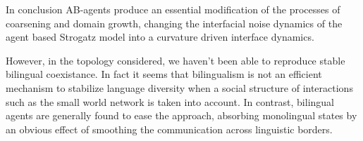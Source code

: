 In conclusion AB-agents produce an essential modification of the processes of coarsening and domain growth, changing the interfacial noise dynamics of the agent based Strogatz model into a curvature driven interface dynamics.

However, in the topology considered, we haven't been able to reproduce stable bilingual coexistance. In fact it seems that bilingualism is not an efficient mechanism to stabilize language diversity when a social structure of interactions such as the small world network is taken into account. In contrast, bilingual agents are generally found to ease the approach, absorbing monolingual states by an obvious effect of smoothing the communication across linguistic borders.



